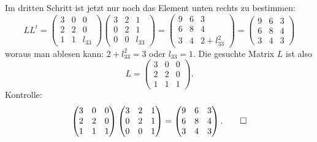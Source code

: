 \begin{loesung}
Im dritten Schritt ist jetzt nur noch das Element unten rechts zu bestimmen:
\[
LL^t=
\begin{pmatrix}
3&0&     0\\
2&2&     0\\
1&1&l_{33}
\end{pmatrix}
\begin{pmatrix}
3&2&     1\\
0&2&     1\\
0&0&l_{33}
\end{pmatrix}
=
\begin{pmatrix}
9&6&3\\
6&8&4\\
3&4&2+l_{33}^2
\end{pmatrix}
=
\begin{pmatrix}
9&6&3\\
6&8&4\\
3&4&3
\end{pmatrix}
\]
woraus man ablesen kann: $2+l_{33}^2=3$ oder $l_{33}=1$. Die gesuchte
Matrix $L$ ist also
\[
L=
\begin{pmatrix}
3&0&0\\
2&2&0\\
1&1&1
\end{pmatrix}.
\]
Kontrolle:
\[
\begin{pmatrix}
3&0&0\\
2&2&0\\
1&1&1
\end{pmatrix}
\begin{pmatrix}
3&2&1\\
0&2&1\\
0&0&1
\end{pmatrix}
=
\begin{pmatrix}
9&6&3\\
6&8&4\\
3&4&3
\end{pmatrix}.
\qedhere
\]
\end{loesung}

